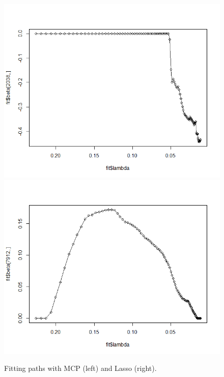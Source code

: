 \documentclass{article}
\begin{document}
\begin{enumerate}
\begin{enumerate}
\begin{figure}[ht]
\centering
\vbox{
\includegraphics[scale=0.3]{path_MCP.png}
\includegraphics[scale=0.3]{path_Lasso.png}
}
\caption{Fitting paths with MCP (left) and Lasso (right).}
\label{3.10.2}
\end{figure}

\end{enumerate}

\end{enumerate}
\end{document}
